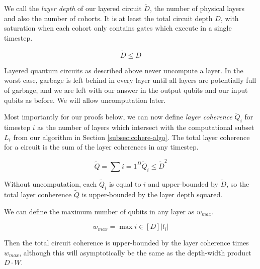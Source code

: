 
We call the \emph{layer depth} of our layered circuit $\tilde{D}$, the number
of physical layers and also the number of cohorts.
It is at least the total circuit depth $D$, with saturation when each cohort
only contains gates which execute in a single timestep.

\begin{equation}
\tilde{D} \le D
\end{equation}

Layered quantum circuits as described above never uncompute
a layer. In the worst case, garbage is left behind in every
layer until all layers are potentially full of garbage,
and we are left with our answer in the output qubits and
our input qubits as before. We will allow uncomputation
later.

Most importantly for our proofs below, we can now define
\emph{layer coherence} $\tilde{Q}_i$  for timestep $i$
as the number of layers which intersect with the computational
subset $L_i$ from our algorithm in Section \ref{subsec:cohere-algo}.
The total layer coherence for a circuit is the sum of the
layer coherences in any timestep.

\begin{equation}
\tilde{Q} = \sum{i=1}^{D} \tilde{Q}_i \le \tilde{D}^2
\end{equation}

Without uncomputation, each $\tilde{Q}_i$ is equal to $i$ and upper-bounded by $\tilde{D}$,
so the total layer conherence $\tilde{Q}$ is upper-bounded by the layer depth squared.

We can define the maximum number of qubits in any layer as $w_{max}$.

\begin{equation}
w_{max} = \max{i \in [D]} |l_i|
\end{equation}

Then the total circuit coherence is upper-bounded by the layer coherence
times $w_{max}$, although this will asymptotically be the same as the depth-width product $D\cdot W$.

